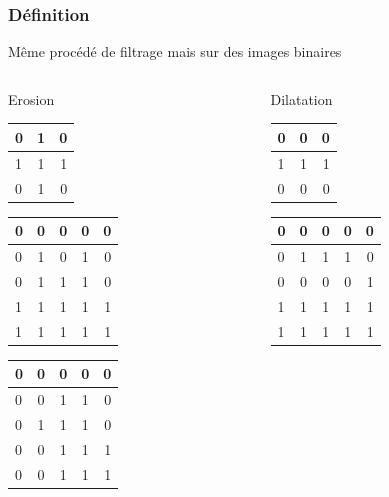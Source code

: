 \documentclass[french]{beamer}
\begin{document}
\begin{frame}
	\frametitle{Définition}
	Même procédé de filtrage mais sur des images binaires
	\begin{columns}[T]
		\begin{column}{3cm}
			Erosion \\
			\bigskip
			\begin{tabular}{|l|c|r|}
				\hline
				0 & 1 & 0 \\ \hline
				1 & 1 & 1 \\ \hline
				0 & 1 & 0 \\
				\hline
			\end{tabular}
			\begin{tabular}{|l|c|c|c|r|}
				\hline
				0 & 0 & 0 & 0 & 0 \\ \hline
				0 & 1 & 0 & 1 & 0 \\ \hline
				0 & 1 & 1 & 1 & 0 \\ \hline
				1 & 1 & 1 & 1 & 1 \\ \hline
				1 & 1 & 1 & 1 & 1 \\
				\hline
			\end{tabular}
			\begin{tabular}{|l|c|c|c|r|}
				\hline
				0 & 0 & 0 & 0 & 0 \\ \hline
				0 & 0 & 1 & 1 & 0 \\ \hline
				0 & 1 & 1 & 1 & 0 \\ \hline
				0 & 0 & 1 & 1 & 1 \\ \hline
				0 & 0 & 1 & 1 & 1 \\
				\hline
			\end{tabular}
		\end{column}
		\begin{column}{3cm}
			Dilatation \\
			\bigskip
			\begin{tabular}{|l|c|r|}
				\hline
				0 & 0 & 0 \\ \hline
				1 & 1 & 1 \\ \hline
				0 & 0 & 0 \\
				\hline
			\end{tabular}
			\begin{tabular}{|l|c|c|c|r|}
				\hline
				0 & 0 & 0 & 0 & 0 \\ \hline
				0 & 1 & 1 & 1 & 0 \\ \hline
				0 & 0 & 0 & 0 & 1 \\ \hline
				1 & 1 & 1 & 1 & 1 \\ \hline
				1 & 1 & 1 & 1 & 1 \\

\end{tabular}
\end{column}
\end{columns}
\end{frame}
\end{document}
